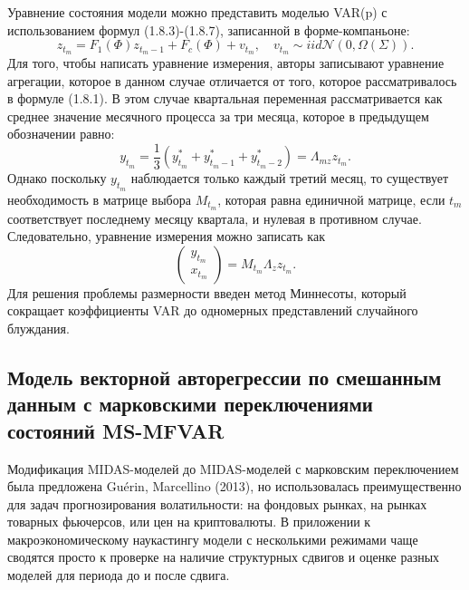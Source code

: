 \documentclass[a4paper, 12pt]{extarticle}
\numberwithin{equation}{subsection}
\begin{document}
	Уравнение состояния модели можно представить моделью VAR(p) с использованием формул (1.8.3)-(1.8.7), записанной в форме-компаньоне: 
	\begin{equation}
		z_{t_m} = F_1(\Phi)z_{t_m - 1} + F_c(\Phi) + v_{t_m},\quad v_{t_m}\sim iid \mathcal{N}(0, \Omega(\Sigma)).
	\end{equation}
	Для того, чтобы написать уравнение измерения, авторы записывают уравнение агрегации, которое в данном случае отличается от того, которое рассматривалось в формуле (1.8.1). В этом случае квартальная переменная рассматривается как среднее значение месячного процесса за три месяца, которое в предыдущем обозначении равно:
	\begin{equation}
		y_{t_m} = \dfrac{1}{3}(y_{t_m}^* + y_{t_m-1}^* + y_{t_m-2}^*) = \Lambda_{mz} z_{t_m}.
	\end{equation}
	Однако поскольку $y_{t_m}$ наблюдается только каждый третий месяц, то существует необходимость в матрице выбора $M_{t_m}$, которая равна единичной матрице, если $t_m$ соответствует последнему месяцу квартала, и нулевая в противном случае. Следовательно, уравнение измерения можно записать как
	\begin{equation}
		\begin{pmatrix}
		y_{t_m}\\ x_{t_m}
	\end{pmatrix} = M_{t_m} \Lambda_z z_{t_m}.
	\end{equation}
	Для решения проблемы размерности введен метод Миннесоты, который сокращает коэффициенты VAR до одномерных представлений случайного блуждания.
	\subsection{Модель векторной авторегрессии по смешанным данным с марковскими переключениями состояний MS-MFVAR}
	Модификация MIDAS-моделей до MIDAS-моделей с марковским переключением была предложена Guérin, Marcellino (2013), но использовалась преимущественно для задач прогнозирования волатильности: на фондовых рынках, на рынках товарных фьючерсов, или цен на криптовалюты. В приложении к макроэкономическому наукастингу модели с несколькими режимами чаще сводятся просто к проверке на наличие структурных сдвигов и оценке разных моделей для периода до и после сдвига.
	
\end{document}
